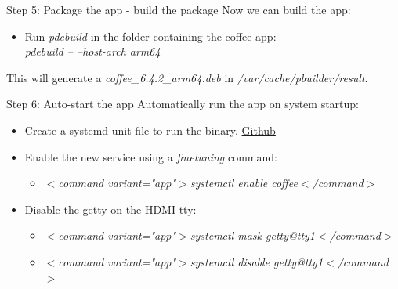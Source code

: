 \documentclass{beamer}
\begin{document}
\begin{frame}{Step 5: Package the app - build the package}
	Now we can build the app:
	\begin{itemize}
		\item Run \emph{pdebuild} in the folder containing the coffee app: \\ \emph{pdebuild -- --host-arch arm64}
	\end{itemize}
	This will generate a \emph{coffee\_6.4.2\_arm64.deb} in \emph{/var/cache/pbuilder/result}.
\end{frame}

\begin{frame}{Step 6: Auto-start the app}
	Automatically run the app on system startup:
	\begin{itemize}
		\item Create a systemd unit file to run the binary.
		\href{https://github.com/tomirgang/eh21_maintainable_linux/blob/main/examples/elbe_advanced/image/rpi-image/overlays/systemd/etc/systemd/system/coffee.service}{Github}
		\item Enable the new service using a \emph{finetuning} command:
		\begin{itemize}
			\item \emph{$<$command variant="app"$>$systemctl enable coffee$<$/command$>$}
		\end{itemize}
		\item Disable the getty on the HDMI tty:
		\begin{itemize}
			\item \emph{$<$command variant="app"$>$systemctl mask getty@tty1$<$/command$>$}
			\item \emph{$<$command variant="app"$>$systemctl disable getty@tty1$<$/command$>$}
		\end{itemize}
	\end{itemize}
\end{frame}
\end{document}
